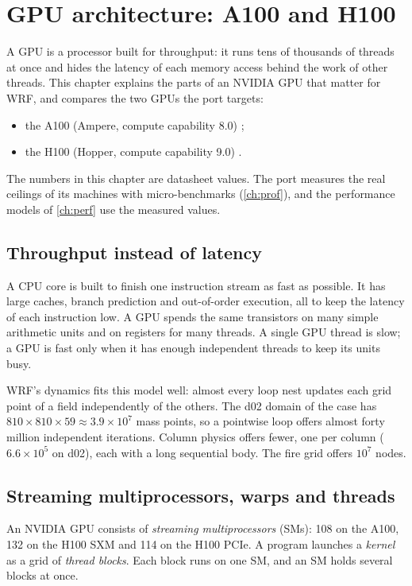 \chapter{GPU architecture: A100 and H100}\label{ch:gpuarch}

A GPU is a processor built for throughput: it runs tens of thousands of threads at once and hides the latency of
each memory access behind the work of other threads. This chapter explains the parts of an NVIDIA GPU that matter
for WRF, and compares the two GPUs the port targets:
\begin{itemize}
  \item the A100 (Ampere, compute capability 8.0) \citep{nvidia2020a100};
  \item the H100 (Hopper, compute capability 9.0) \citep{nvidia2022h100}.
\end{itemize}
The numbers in this chapter are datasheet values. The port measures the real ceilings of its machines with
micro-benchmarks (\cref{ch:prof}), and the performance models of \cref{ch:perf} use the measured values.

\section{Throughput instead of latency}

A CPU core is built to finish one instruction stream as fast as possible. It has large caches, branch prediction
and out-of-order execution, all to keep the latency of each instruction low. A GPU spends the same transistors on
many simple arithmetic units and on registers for many threads. A single GPU thread is slow; a GPU is fast only when
it has enough independent threads to keep its units busy.

WRF's dynamics fits this model well: almost every loop nest updates each grid point of a field independently of the
others. The d02 domain of the case has $810 \times 810 \times 59 \approx 3.9 \times 10^7$ mass points, so a
pointwise loop offers almost forty million independent iterations. Column physics offers fewer, one per column
($6.6\times10^5$ on d02), each with a long sequential body. The fire grid offers $10^7$ nodes.

\section{Streaming multiprocessors, warps and threads}

An NVIDIA GPU consists of \emph{streaming multiprocessors} (SMs): 108 on the A100, 132 on the H100 SXM and 114 on
the H100 PCIe. A program launches a \emph{kernel} as a grid of \emph{thread blocks}. Each block runs on one SM, and
an SM holds several blocks at once.


